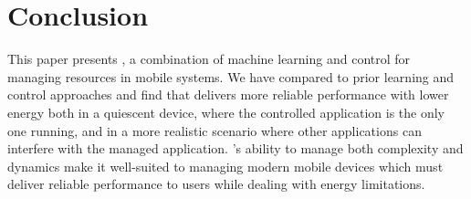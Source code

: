 \section{Conclusion}
This paper presents \SYSTEM{}, a combination of machine learning and
control for managing resources in mobile systems.  We have compared
\SYSTEM{} to prior learning and control approaches and find that
\SYSTEM{} delivers more reliable performance with lower energy both in
a quiescent device, where the controlled application is the only one
running, and in a more realistic scenario where other applications can
interfere with the managed application.  \SYSTEM{}'s ability to manage
both complexity and dynamics make it well-suited to managing modern
mobile devices which must deliver reliable performance to users while
dealing with energy limitations.
